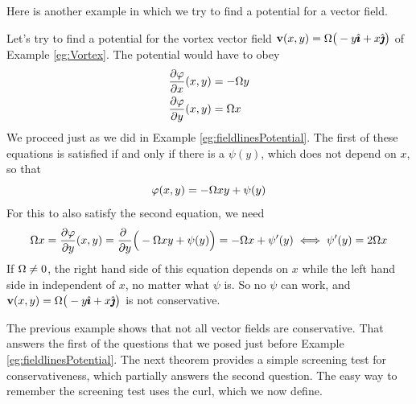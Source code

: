 Here is another example in which we try to find a potential for a vector field.

\begin{eg}\label{eg:potentialB}
Let's try to find a potential for the vortex vector field
$\mathbf{v}(x,y) = \Omega\big(-y\hat{\pmb{\imath}} +x\hat{\pmb{\jmath}}\big)$ of Example \ref{eg:Vortex}.
The potential would have to obey
\begin{align*}
\frac{\partial \varphi}{\partial x}(x,y) &= -\Omega y \\
\frac{\partial \varphi}{\partial y}(x,y) &= \Omega x 
\end{align*}
We proceed just as we did in Example \ref{eg:fieldlinesPotential}.
The first of these equations is satisfied if and only if there is a 
$\psi(y)$, which does not depend on $x$, so that 
\begin{equation*}
\varphi(x,y) = -\Omega xy +\psi(y)
\end{equation*}
For this to also satisfy the second equation, we need
\begin{align*}
\Omega x=\frac{\partial \varphi}{\partial y}(x,y)
=\frac{\partial\ }{\partial y}\Big(-\Omega xy +\psi(y)\Big)
=-\Omega x +\psi'(y)
\iff \psi'(y) = 2\Omega x
\end{align*}
If $\Omega\ne 0$, the right hand side of this equation depends on $x$
while the left hand side in independent of $x$, no matter what $\psi$ is.
So no $\psi$ can work, and $\mathbf{v}(x,y) = \Omega\big(-y\hat{\pmb{\imath}} +x\hat{\pmb{\jmath}}\big)$ is not 
conservative. 
\end{eg}

The previous example shows that not all vector fields are conservative.
That answers the first of the questions that we posed just before Example
\ref{eg:fieldlinesPotential}.
The next theorem provides a simple screening test for conservativeness,
which partially answers the second question. The easy way to remember the
screening test uses the curl, which we now define.

